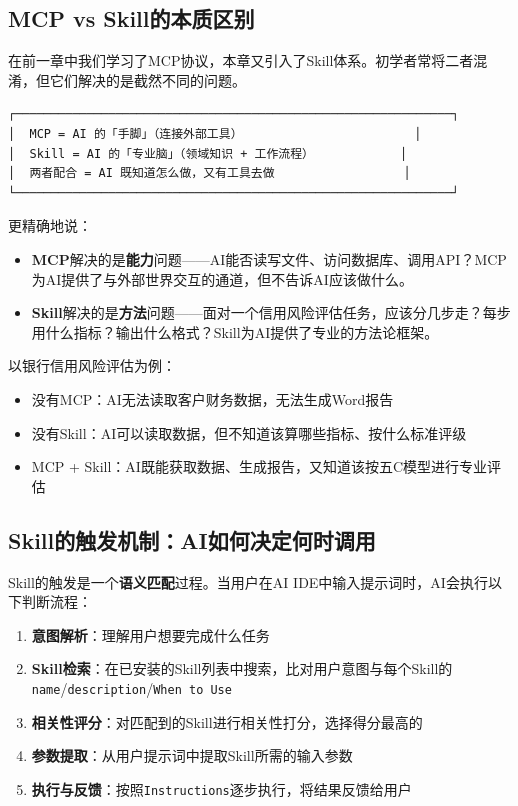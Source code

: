 \subsection{MCP vs Skill的本质区别}

在前一章中我们学习了MCP协议，本章又引入了Skill体系。初学者常将二者混淆，但它们解决的是截然不同的问题。

\begin{theorybox}
\begin{verbatim}
┌─────────────────────────────────────────────────────────────┐
│  MCP = AI 的「手脚」（连接外部工具）                        │
│  Skill = AI 的「专业脑」（领域知识 + 工作流程）            │
│  两者配合 = AI 既知道怎么做，又有工具去做                  │
└─────────────────────────────────────────────────────────────┘
\end{verbatim}

更精确地说：
\begin{itemize}[leftmargin=1em]
  \item \textbf{MCP}解决的是\textbf{能力}问题——AI能否读写文件、访问数据库、调用API？MCP为AI提供了与外部世界交互的通道，但不告诉AI应该做什么。
  \item \textbf{Skill}解决的是\textbf{方法}问题——面对一个信用风险评估任务，应该分几步走？每步用什么指标？输出什么格式？Skill为AI提供了专业的方法论框架。
\end{itemize}

以银行信用风险评估为例：
\begin{itemize}[leftmargin=1em]
  \item 没有MCP：AI无法读取客户财务数据，无法生成Word报告
  \item 没有Skill：AI可以读取数据，但不知道该算哪些指标、按什么标准评级
  \item MCP + Skill：AI既能获取数据、生成报告，又知道该按五C模型进行专业评估
\end{itemize}
\end{theorybox}

\subsection{Skill的触发机制：AI如何决定何时调用}

Skill的触发是一个\textbf{语义匹配}过程。当用户在AI IDE中输入提示词时，AI会执行以下判断流程：

\begin{enumerate}[leftmargin=2em]
  \item \textbf{意图解析}：理解用户想要完成什么任务
  \item \textbf{Skill检索}：在已安装的Skill列表中搜索，比对用户意图与每个Skill的\texttt{name}/\texttt{description}/\texttt{When to Use}
  \item \textbf{相关性评分}：对匹配到的Skill进行相关性打分，选择得分最高的
  \item \textbf{参数提取}：从用户提示词中提取Skill所需的输入参数
  \item \textbf{执行与反馈}：按照\texttt{Instructions}逐步执行，将结果反馈给用户
\end{enumerate}

